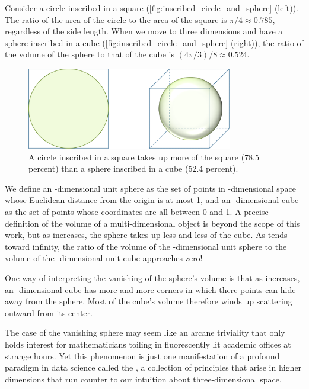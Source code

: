 Consider a circle inscribed in a square (\autoref{fig:inscribed_circle_and_sphere} (left)). The ratio of the area of the circle to the area of the square is $\pi/4 \approx 0.785$, regardless of the side length. When we move to three dimensions and have a sphere inscribed in a cube (\autoref{fig:inscribed_circle_and_sphere} (right)), the ratio of the volume of the sphere to that of the cube is $(4\pi/3)/8 \approx 0.524$.\\

\begin{figure}[h]
\centering
\mySfFamily
\includegraphics[width = 0.8\textwidth]{../images/inscribed_circle_and_sphere.png}
\caption{A circle inscribed in a square takes up more of the square (78.5 percent) than a sphere inscribed in a cube (52.4 percent).}
\label{fig:inscribed_circle_and_sphere}
\end{figure}

We define an -dimensional unit sphere as the set of points in -dimensional space whose Euclidean distance from the origin is at most 1, and an -dimensional cube as the set of points whose coordinates are all between 0 and 1. A precise definition of the volume of a multi-dimensional object is beyond the scope of this work, but as  increases, the sphere takes up less and less of the cube. As  tends toward infinity, the ratio of the volume of the -dimensional unit sphere to the volume of the -dimensional unit cube approaches zero!

One way of interpreting the vanishing of the sphere's volume is that as  increases, an -dimensional cube has more and more corners in which there points can hide away from the sphere. Most of the cube's volume therefore winds up scattering outward from its center.

The case of the vanishing sphere may seem like an arcane triviality that only holds interest for mathematicians toiling in fluorescently lit academic offices at strange hours. Yet this phenomenon is just one manifestation of a profound paradigm in data science called the , a collection of principles that arise in higher dimensions that run counter to our intuition about three-dimensional space.

